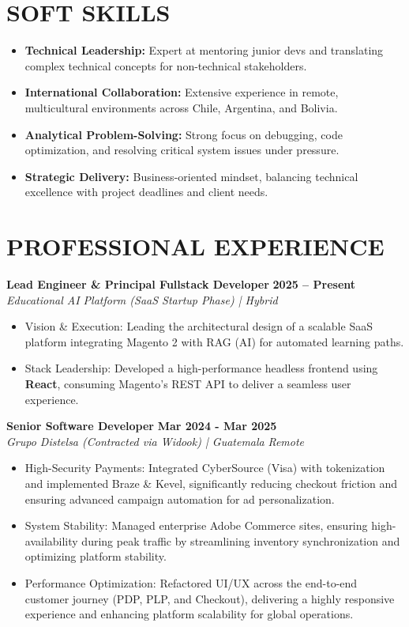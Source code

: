 \documentclass[11pt, a4paper]{article}
\newcommand{\header}[1]{\section*{\fontsize{10.5}{11}\selectfont\bfseries\color{accent}\uppercase{#1}}}
\newcommand{\jobtitle}[2]{\textbf{#1} \hfill \textbf{\small #2}} %
\newcommand{\company}[1]{\textit{#1}} %
\begin{document}
	\header{Soft Skills}
\begin{itemize}[noitemsep, topsep=2pt]
	\item \textbf{Technical Leadership:} Expert at mentoring junior devs and translating complex technical concepts for non-technical stakeholders.
	\item \textbf{International Collaboration:} Extensive experience in remote, multicultural environments across Chile, Argentina, and Bolivia.
	\item \textbf{Analytical Problem-Solving:} Strong focus on debugging, code optimization, and resolving critical system issues under pressure.
	\item \textbf{Strategic Delivery:} Business-oriented mindset, balancing technical excellence with project deadlines and client needs.
\end{itemize}
	
	
	\header{Professional Experience}
	\jobtitle{Lead Engineer \& Principal Fullstack Developer}{2025 -- Present} \\
	\company{Educational AI Platform (SaaS Startup Phase) | Hybrid}
	\begin{itemize}[noitemsep, topsep=2pt]
		\item Vision \& Execution: Leading the architectural design of a scalable SaaS platform integrating Magento 2 with RAG (AI) for automated learning paths.
		\item Stack Leadership: Developed a high-performance headless frontend using \textbf{React}, consuming Magento’s REST API to deliver a seamless user experience.
	\end{itemize}
		
	\jobtitle{Senior Software Developer}{Mar 2024 - Mar 2025} \\
	\company{Grupo Distelsa (Contracted via Widook) | Guatemala} \hfill \textit{Remote}
\begin{itemize}[noitemsep, topsep=2pt]
	\item High-Security Payments: Integrated CyberSource (Visa) with tokenization and implemented Braze \& Kevel, significantly reducing checkout friction and ensuring advanced campaign automation for ad personalization.
	\item System Stability: Managed enterprise Adobe Commerce sites, ensuring high-availability during peak traffic by streamlining inventory synchronization and optimizing platform stability.
	\item Performance Optimization: Refactored UI/UX across the end-to-end customer journey (PDP, PLP, and Checkout), delivering a highly responsive experience and enhancing platform scalability for global operations.
\end{itemize}
\end{document}
